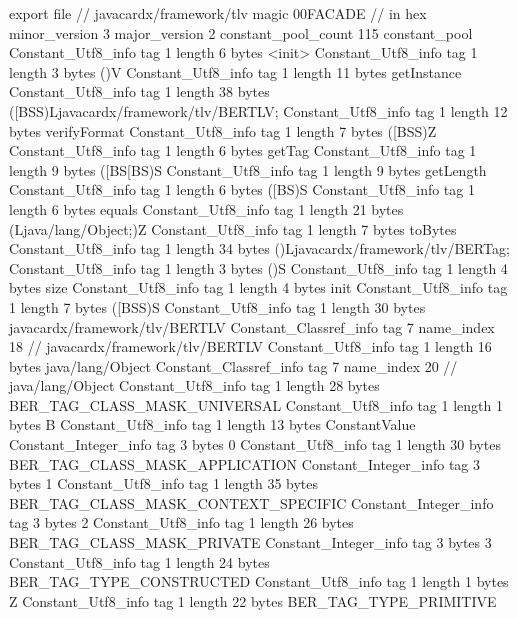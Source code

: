 export file {		// javacardx/framework/tlv
	magic	00FACADE		 // in hex
	minor_version	3
	major_version	2
	constant_pool_count	115
	constant_pool {
		Constant_Utf8_info {
			tag	1
			length	6
			bytes	<init>
		}
		Constant_Utf8_info {
			tag	1
			length	3
			bytes	()V
		}
		Constant_Utf8_info {
			tag	1
			length	11
			bytes	getInstance
		}
		Constant_Utf8_info {
			tag	1
			length	38
			bytes	([BSS)Ljavacardx/framework/tlv/BERTLV;
		}
		Constant_Utf8_info {
			tag	1
			length	12
			bytes	verifyFormat
		}
		Constant_Utf8_info {
			tag	1
			length	7
			bytes	([BSS)Z
		}
		Constant_Utf8_info {
			tag	1
			length	6
			bytes	getTag
		}
		Constant_Utf8_info {
			tag	1
			length	9
			bytes	([BS[BS)S
		}
		Constant_Utf8_info {
			tag	1
			length	9
			bytes	getLength
		}
		Constant_Utf8_info {
			tag	1
			length	6
			bytes	([BS)S
		}
		Constant_Utf8_info {
			tag	1
			length	6
			bytes	equals
		}
		Constant_Utf8_info {
			tag	1
			length	21
			bytes	(Ljava/lang/Object;)Z
		}
		Constant_Utf8_info {
			tag	1
			length	7
			bytes	toBytes
		}
		Constant_Utf8_info {
			tag	1
			length	34
			bytes	()Ljavacardx/framework/tlv/BERTag;
		}
		Constant_Utf8_info {
			tag	1
			length	3
			bytes	()S
		}
		Constant_Utf8_info {
			tag	1
			length	4
			bytes	size
		}
		Constant_Utf8_info {
			tag	1
			length	4
			bytes	init
		}
		Constant_Utf8_info {
			tag	1
			length	7
			bytes	([BSS)S
		}
		Constant_Utf8_info {
			tag	1
			length	30
			bytes	javacardx/framework/tlv/BERTLV
		}
		Constant_Classref_info {
			tag	7
			name_index	18		// javacardx/framework/tlv/BERTLV
		}
		Constant_Utf8_info {
			tag	1
			length	16
			bytes	java/lang/Object
		}
		Constant_Classref_info {
			tag	7
			name_index	20		// java/lang/Object
		}
		Constant_Utf8_info {
			tag	1
			length	28
			bytes	BER_TAG_CLASS_MASK_UNIVERSAL
		}
		Constant_Utf8_info {
			tag	1
			length	1
			bytes	B
		}
		Constant_Utf8_info {
			tag	1
			length	13
			bytes	ConstantValue
		}
		Constant_Integer_info {
			tag	3
			bytes	0
		}
		Constant_Utf8_info {
			tag	1
			length	30
			bytes	BER_TAG_CLASS_MASK_APPLICATION
		}
		Constant_Integer_info {
			tag	3
			bytes	1
		}
		Constant_Utf8_info {
			tag	1
			length	35
			bytes	BER_TAG_CLASS_MASK_CONTEXT_SPECIFIC
		}
		Constant_Integer_info {
			tag	3
			bytes	2
		}
		Constant_Utf8_info {
			tag	1
			length	26
			bytes	BER_TAG_CLASS_MASK_PRIVATE
		}
		Constant_Integer_info {
			tag	3
			bytes	3
		}
		Constant_Utf8_info {
			tag	1
			length	24
			bytes	BER_TAG_TYPE_CONSTRUCTED
		}
		Constant_Utf8_info {
			tag	1
			length	1
			bytes	Z
		}
		Constant_Utf8_info {
			tag	1
			length	22
			bytes	BER_TAG_TYPE_PRIMITIVE
}}}
